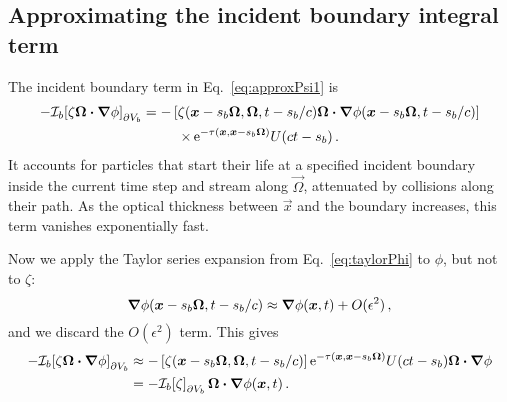 \subsection{Approximating the incident boundary integral term}
\label{sec:adIncident}
The incident boundary term in Eq.~\eqref{eq:approxPsi1} is
\begin{multline*}
-\mathcal{I}_{b}\!\left[\zeta \bm{\Omega}\bm{\cdot} \bm{\nabla} \phi\right]_{\partial V_b}
  = -\left[\zeta(\bm{x} - s_b\bm{\Omega}, \bm{\Omega}, t - s_b/c)
   \bm{\Omega}\bm{\cdot} \bm{\nabla} \phi(\bm{x} - s_b\bm{\Omega}, t - s_b/c) \right]
   \\
\times
    \mathop{}\!\mathrm{e}^{ -\tau(\bm{x}, \bm{x} - s_b \bm{\Omega})}
    U(ct - s_b) \,.
\end{multline*}
It accounts for particles that start their life at a specified incident boundary
inside the current time step and stream along $\vec{\Omega}$, attenuated by
collisions along their path. As the optical thickness between
$\vec{x}$ and the boundary increases, this term vanishes
exponentially fast.

Now we apply the Taylor series expansion from Eq.~\eqref{eq:taylorPhi} to
$\phi$, but not to $\zeta$:
\begin{equation*}
  \bm{\nabla} \phi(\bm{x} - s_b\bm{\Omega}, t - s_b/c)
  \approx \bm{\nabla} \phi(\bm{x}, t) + O(\epsilon^2)\,,
\end{equation*}
and we discard the $O(\epsilon^2)$ term. This gives
\begin{align} \nonumber
-\mathcal{I}_{b}\!\left[\zeta \bm{\Omega}\bm{\cdot} \bm{\nabla} \phi\right]_{\partial V_b}
&\approx -\left[\zeta(\bm{x} - s_b\bm{\Omega}, \bm{\Omega}, t - s_b/c) \right]
  \mathop{}\!\mathrm{e}^{ -\tau(\bm{x}, \bm{x} - s_b \bm{\Omega})} U(ct - s_b)
  \bm{\Omega}\bm{\cdot} \bm{\nabla} \phi
 \\ \label{eq:bndyApprox}
&= -\mathcal{I}_{b}\!\left[\zeta\right]_{\partial V_b} \bm{\Omega}\bm{\cdot} \bm{\nabla} \phi(\bm{x}, t) \,.
\end{align}

